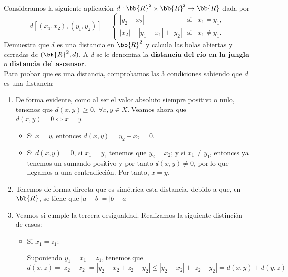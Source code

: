 \begin{ejercicio}
    Consideramos la siguiente aplicación $d:\bb{R}^2\times \bb{R}^2\to \bb{R}$ dada por
    \begin{equation*}
        d[(x_1, x_2), (y_1, y_2)] = \left\{
        \begin{array}{lll}
            |y_2-x_2| & \text{si} & x_1=y_1, \\
            |x_2| + |y_1-x_1| + |y_2| & \text{si} & x_1\neq y_1.
        \end{array}
        \right.
    \end{equation*}
    Demuestra que $d$ es una distancia en $\bb{R}^2$ y calcula las bolas abiertas y cerradas de $(\bb{R}^2, d)$. A $d$ se le denomina la \textbf{distancia del río en la jungla} o \textbf{distancia del ascensor}.\\

    Para probar que es una distancia, comprobamos las 3 condiciones sabiendo que $d$ es una distancia:
    \begin{enumerate}
        \item De forma evidente, como al ser el valor absoluto siempre positivo o nulo, tenemos que $d(x,y)\geq 0,~\forall x,y\in X$. Veamos ahora que $d(x,y)=0 \Longleftrightarrow x=y$.
        \begin{itemize}
            \item Si $x=y$, entonces $d(x,y)=y_2-x_2=0$.
            \item Si $d(x,y)=0$, si $x_1=y_1$ tenemos que $y_2=x_2$; y si $x_1\neq y_1$, entonces ya tenemos un sumando positivo y por tanto  $d(x,y)\neq 0$, por lo que llegamos a una contradicción. Por tanto, $x=y$.
        \end{itemize}


        \item Tenemos de forma directa que es simétrica esta distancia, debido a que, en $\bb{R}$, se tiene que $|a-b|=|b-a|$ .

        \item Veamos si cumple la tercera desigualdad. Realizamos la siguiente distinción de casos:  
        \begin{itemize}
            \item Si $x_1=z_1$:

            Suponiendo $y_1=x_1=z_1$, tenemos que
            \begin{equation*}
                d(x,z)=|z_2-x_2| = |y_2-x_2+z_2-y_2|\leq |y_2-x_2| + |z_2-y_2| = d(x,y) + d(y,z)
            \end{equation*}


\end{itemize}
\end{enumerate}
\end{ejercicio}
